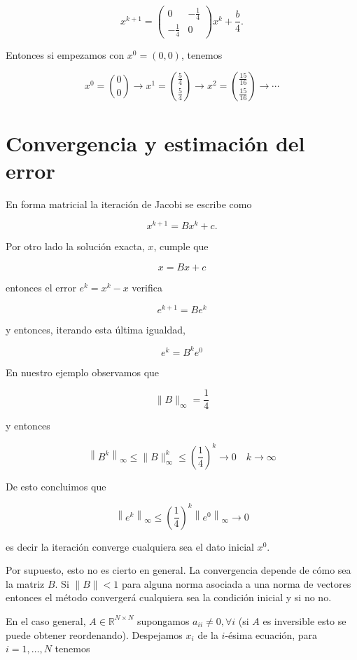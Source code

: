 \documentclass[10pt]{article}
\begin{document}
$$
x^{k+1}=\left(\begin{array}{cc}
0 & -\frac{1}{4} \\
-\frac{1}{4} & 0
\end{array}\right) x^{k}+\frac{b}{4} .
$$

Entonces si empezamos con $x^{0}=(0,0)$, tenemos

$$
x^{0}=\binom{0}{0} \rightarrow x^{1}=\binom{\frac{5}{4}}{\frac{5}{4}} \rightarrow x^{2}=\binom{\frac{15}{16}}{\frac{15}{16}} \rightarrow \cdots
$$

\section*{Convergencia y estimación del error}
En forma matricial la iteración de Jacobi se escribe como

$$
x^{k+1}=B x^{k}+c .
$$

Por otro lado la solución exacta, $x$, cumple que

$$
x=B x+c
$$

entonces el error $e^{k}=x^{k}-x$ verifica

$$
e^{k+1}=B e^{k}
$$

y entonces, iterando esta última igualdad,

$$
e^{k}=B^{k} e^{0}
$$

En nuestro ejemplo observamos que

$$
\|B\|_{\infty}=\frac{1}{4}
$$

y entonces

$$
\left\|B^{k}\right\|_{\infty} \leq\|B\|_{\infty}^{k} \leq\left(\frac{1}{4}\right)^{k} \rightarrow 0 \quad k \rightarrow \infty
$$

De esto concluimos que

$$
\left\|e^{k}\right\|_{\infty} \leq\left(\frac{1}{4}\right)^{k}\left\|e^{0}\right\|_{\infty} \rightarrow 0
$$

es decir la iteración converge cualquiera sea el dato inicial $x^{0}$.

Por supuesto, esto no es cierto en general. La convergencia depende de cómo sea la matriz $B$. Si $\|B\|<1$ para alguna norma asociada a una norma de vectores entonces el método convergerá cualquiera sea la condición inicial y si no no.

En el caso general, $A \in \mathbb{R}^{N \times N}$ supongamos $a_{i i} \neq 0, \forall i$ (si $A$ es inversible esto se puede obtener reordenando). Despejamos $x_{i}$ de la $i$-ésima ecuación, para $i=1, \ldots, N$ tenemos
\end{document}
